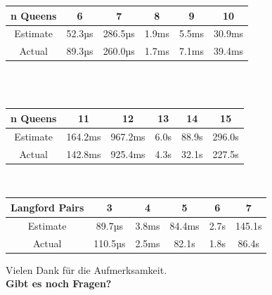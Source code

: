 \documentclass[aspectratio=43,t]{beamer}
\begin{document}
\begin{frame}
  \begin{center}
  \begin{tabular}{|| c | c c c c c ||} 
    \hline
    n Queens &  6 & 7 & 8 & 9 & 10 \\ [0.5ex] 
    \hline\hline
    Estimate &  52.3µs & 286.5µs & 1.9ms & 5.5ms & 30.9ms \\ 
    \hline
    Actual & 89.3µs & 260.0µs & 1.7ms & 7.1ms & 39.4ms \\
    \hline
   \end{tabular} \\
   \ \\
   \begin{tabular}{|| c | c c c c c ||} 
    \hline
    n Queens &  11 & 12 & 13 & 14 & 15 \\ [0.5ex] 
    \hline\hline
    Estimate & 164.2ms & 967.2ms & 6.0s & 88.9s & 296.0s \\ 
    \hline
    Actual & 142.8ms & 925.4ms & 4.3s & 32.1s & 227.5s \\
    \hline
   \end{tabular}
   \ \\
   \begin{tabular}{|| c | c c c c c ||} 
    \hline
    Langford Pairs & 3 & 4 & 5 & 6 & 7 \\ [0.5ex] 
    \hline\hline
    Estimate & 89.7µs & 3.8ms & 84.4ms & 2.7s & 145.1s \\ 
    \hline
    Actual & 110.5µs & 2.5ms & 82.1s & 1.8s & 86.4s \\
    \hline
   \end{tabular}
  \end{center}
\end{frame}

  { %
    \begin{frame}[c,noframenumbering]
      \begin{center}
        Vielen Dank für die Aufmerksamkeit.\\
        {\bf Gibt es noch Fragen?}
      \end{center}
    \end{frame}
  }
\end{document}
